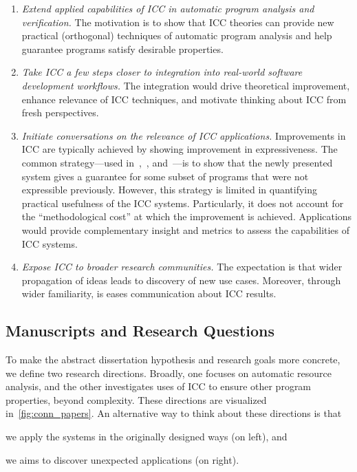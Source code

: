 \begin{enumerate}[label={\textbf{G\arabic*.}}]

\item\emph{Extend applied capabilities of ICC in automatic program analysis and verification.}
The motivation is to show that ICC theories can provide new practical (orthogonal) techniques of automatic program analysis and help guarantee programs satisfy desirable properties.

\item\emph{Take ICC a few steps closer to integration into real-world software development workflows.}
The integration would drive theoretical improvement, enhance relevance of ICC techniques, and motivate thinking about ICC from fresh perspectives.

\item \emph{Initiate conversations on the relevance of ICC applications.}
Improvements in ICC are typically achieved by showing improvement in expressiveness.
The common strategy---used \eg in~\cite[p.16--17]{hainry2023},~\cite[p. 17]{jones2009}, and~\cite[p. 147]{feree2018}---is to show that the newly presented system gives a guarantee for some subset of programs that were not expressible previously.
However, this strategy is limited in quantifying practical usefulness of the ICC systems.
Particularly, it does not account for the \enquote{methodological cost} at which the improvement is achieved.
Applications would provide complementary insight and metrics to assess the capabilities of ICC systems.

\item \emph{Expose ICC to broader research communities.}
The expectation is that wider propagation of ideas leads to discovery of new use cases.
Moreover, through wider familiarity, is eases communication about ICC results.

\end{enumerate}

\subsection{Manuscripts and Research Questions}
\label{subsec:conn-papers}

To make the abstract dissertation hypothesis and research goals more concrete, we define two research directions.
Broadly, one focuses on automatic resource analysis, and the other investigates uses of ICC to ensure other program properties, beyond complexity.
These directions are visualized in~\autoref{fig:conn_papers}. An alternative way to think about these directions is that
\begin{enumerate*}
\item we apply the systems in the originally designed ways (on left), and
\item we aims to discover unexpected applications (on right).
\end{enumerate*}

